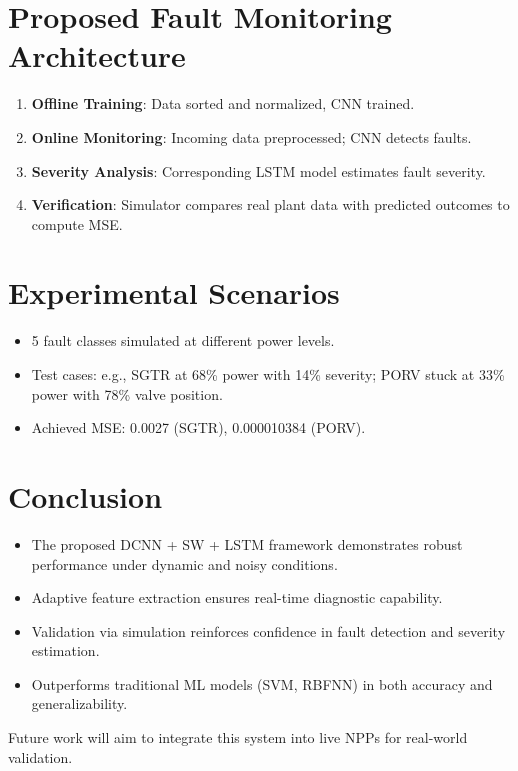 \documentclass[12pt]{article}
\begin{document}
\section*{Proposed Fault Monitoring Architecture}
\begin{enumerate}
    \item \textbf{Offline Training}: Data sorted and normalized, CNN trained.
    \item \textbf{Online Monitoring}: Incoming data preprocessed; CNN detects faults.
    \item \textbf{Severity Analysis}: Corresponding LSTM model estimates fault severity.
    \item \textbf{Verification}: Simulator compares real plant data with predicted outcomes to compute MSE.
\end{enumerate}

\section*{Experimental Scenarios}
\begin{itemize}
    \item 5 fault classes simulated at different power levels.
    \item Test cases: e.g., SGTR at 68\% power with 14\% severity; PORV stuck at 33\% power with 78\% valve position.
    \item Achieved MSE: 0.0027 (SGTR), 0.000010384 (PORV).
\end{itemize}

\section*{Conclusion}
\begin{itemize}
    \item The proposed DCNN + SW + LSTM framework demonstrates robust performance under dynamic and noisy conditions.
    \item Adaptive feature extraction ensures real-time diagnostic capability.
    \item Validation via simulation reinforces confidence in fault detection and severity estimation.
    \item Outperforms traditional ML models (SVM, RBFNN) in both accuracy and generalizability.
\end{itemize}

Future work will aim to integrate this system into live NPPs for real-world validation.
\end{document}

